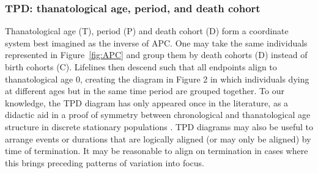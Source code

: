 \documentclass[12pt,oneside,a4paper]{article} %
\newcommand\tgh[1]{\raisebox{-.25\height}{\texttt{[image: Figures/triadtable/triad\#1.pdf]}}}
\begin{document}
\FloatBarrier
\subsubsection{TPD: thanatological age, period, and death cohort}%

Thanatological age (T), period (P) and death cohort (D) form a coordinate system
best imagined as the inverse of APC. One may take the same individuals
represented in Figure~\ref{fig:APC} and group them by death cohorts (D) instead
of birth cohorts (C). Lifelines then descend such that all
endpoints align to thanatological age 0, creating the diagram in Figure 2 in which individuals dying at different ages but in the same time period are grouped together.
To our knowledge, the TPD diagram has only appeared once in the literature, as
a didactic aid in a proof of symmetry between chronological and thanatological
age structure in discrete stationary populations \citep{villavicencioRiffeSymmetires2016}. TPD
diagrams may also be useful to arrange events or durations that are logically
aligned (or may only be aligned) by time of termination. It may be reasonable to
align on termination in cases where this brings preceding patterns of
variation into focus.
\end{document}
